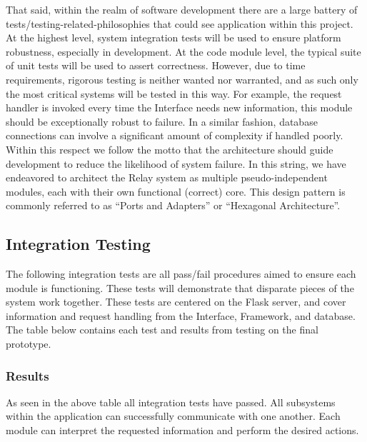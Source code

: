 \documentclass{report}
\begin{document}
That said, within the realm of software development there are a large battery of tests/testing-related-philosophies that could see application within this project.
At the highest level, system integration tests will be used to ensure platform robustness, especially in development.
At the code module level, the typical suite of unit tests will be used to assert correctness.
However, due to time requirements, rigorous testing is neither wanted nor warranted, and as such only the most critical systems will be tested in this way.
For example, the request handler is invoked every time the Interface needs new information, this module should be exceptionally robust to failure.
In a similar fashion, database connections can involve a significant amount of complexity if handled poorly.
Within this respect we follow the motto that the architecture should guide development to reduce the likelihood of system failure.
In this string, we have endeavored to architect the Relay system as multiple pseudo-independent modules, each with their own functional (correct) core.
This design pattern is commonly referred to as ``Ports and Adapters'' or ``Hexagonal Architecture''.

\subsection{Integration Testing}
The following integration tests are all pass/fail procedures aimed to ensure each module is functioning. 
These tests will demonstrate that disparate pieces of the system work together. 
These tests are centered on the Flask server, and cover information and request handling from the Interface, Framework, and database. 
The table below contains each test and results from testing on the final prototype.

\subsubsection{Results}
As seen in the above table all integration tests have passed. All subsystems within the application can successfully communicate with one another. Each module can interpret the requested information and perform the desired actions.
\end{document}
